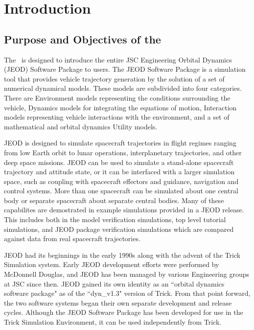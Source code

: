 %
%
%
%
% 
%
\chapter{Introduction}\label{ch:intro}%

\section{Purpose and Objectives of the \MODELTITLE}

The \TLD\ is designed to introduce the entire JSC Engineering Orbital Dynamics (JEOD) Software Package to users. The JEOD Software Package is a simulation tool that provides vehicle trajectory generation by the solution of a set of numerical dynamical models. These models are subdivided into four categories. There are Environment models representing the conditions surrounding the vehicle, Dynamics models for integrating the equations of motion, Interaction models representing vehicle interactions with the environment, and a set of mathematical and orbital dynamics Utility models.

JEOD is designed to simulate spacecraft trajectories in flight regimes ranging from low Earth orbit to lunar operations, interplanetary trajectories, and other deep space missions. JEOD can be used to simulate a stand-alone spacecraft trajectory and attitude state, or it can be interfaced with a larger simulation space, such as coupling with spacecraft effectors and guidance, navigation and control systems. More than one spacecraft can be simulated about one central body or separate spacecraft about separate central bodies. Many of these capabilites are demostrated in example simulations provided in a JEOD release.  This includes both in the model verification simulations, top level tutorial simulations, and JEOD package verification simulations which are compared against data from real spacecraft trajectories.

JEOD had its beginnings in the early 1990s along with the advent of the Trick Simulation system.  Early JEOD development efforts were performed by McDonnell Douglas, and JEOD has been managed by various Engineering groups at JSC since then.  JEOD gained its own identity as an ``orbital dynamics software package" as of the ``dyn\_v1.3" version of Trick.  From that point forward, the two software systems began their own separate development and release cycles. Although the JEOD Software Package has been developed for use in the Trick Simulation Environment, it can be used independently from Trick.

